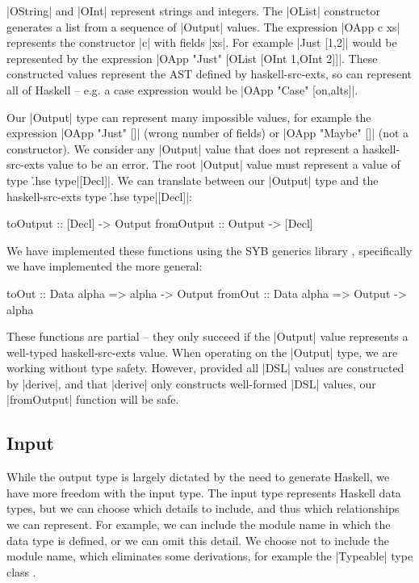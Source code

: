 \documentclass{llncs}
\begin{document}
\noindent|OString| and |OInt| represent strings and integers. The |OList| constructor generates a list from a sequence of |Output| values. The expression |OApp c xs| represents the constructor |c| with fields |xs|. For example |Just [1,2]| would be represented by the expression |OApp "Just" [OList [OInt 1,OInt 2]]|. These constructed values represent the AST defined by haskell-src-exts, so can represent all of Haskell -- e.g. a case expression would be |OApp "Case" [on,alts]|.

Our |Output| type can represent many impossible values, for example the expression |OApp "Just" []| (wrong number of fields) or |OApp "Maybe" []| (not a constructor). We consider any |Output| value that does not represent a haskell-src-exts value to be an error. The root |Output| value must represent a value of type \h{.hse type}|[Decl]|. We can translate between our |Output| type and the haskell-src-exts type \h{.hse type}|[Decl]|:

\begin{code}
toOutput    :: [Decl] -> Output
fromOutput  :: Output -> [Decl]
\end{code}

We have implemented these functions using the SYB generics library \cite{lammel:syb2}, specifically we have implemented the more general:

\begin{code}
toOut    :: Data alpha => alpha -> Output
fromOut  :: Data alpha => Output -> alpha
\end{code}

These functions are partial -- they only succeed if the |Output| value represents a well-typed haskell-src-exts value. When operating on the |Output| type, we are working without type safety. However, provided all |DSL| values are constructed by |derive|, and that |derive| only constructs well-formed |DSL| values, our |fromOutput| function will be safe.

\subsection{Input}

While the output type is largely dictated by the need to generate Haskell, we have more freedom with the input type. The input type represents Haskell data types, but we can choose which details to include, and thus which relationships we can represent. For example, we can include the module name in which the data type is defined, or we can omit this detail. We choose not to include the module name, which eliminates some derivations, for example the |Typeable| type class \cite{lammel:syb}.
\end{document}

